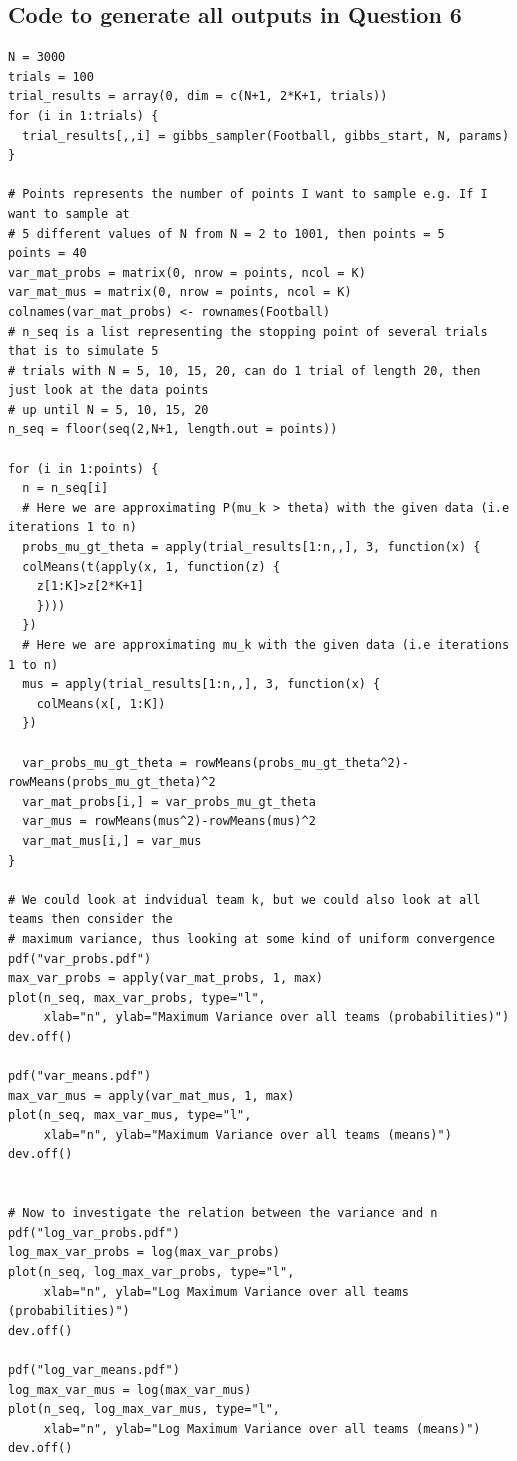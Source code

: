 \documentclass[11pt]{article} %
\begin{document}
\subsection*{Code to generate all outputs in Question 6}
\begin{lstlisting}
N = 3000
trials = 100
trial_results = array(0, dim = c(N+1, 2*K+1, trials))
for (i in 1:trials) {
  trial_results[,,i] = gibbs_sampler(Football, gibbs_start, N, params)
}

# Points represents the number of points I want to sample e.g. If I want to sample at
# 5 different values of N from N = 2 to 1001, then points = 5
points = 40
var_mat_probs = matrix(0, nrow = points, ncol = K)
var_mat_mus = matrix(0, nrow = points, ncol = K)
colnames(var_mat_probs) <- rownames(Football)
# n_seq is a list representing the stopping point of several trials that is to simulate 5 
# trials with N = 5, 10, 15, 20, can do 1 trial of length 20, then just look at the data points
# up until N = 5, 10, 15, 20
n_seq = floor(seq(2,N+1, length.out = points))

for (i in 1:points) {
  n = n_seq[i]
  # Here we are approximating P(mu_k > theta) with the given data (i.e iterations 1 to n)
  probs_mu_gt_theta = apply(trial_results[1:n,,], 3, function(x) {
  colMeans(t(apply(x, 1, function(z) {
    z[1:K]>z[2*K+1]
    })))
  })
  # Here we are approximating mu_k with the given data (i.e iterations 1 to n)
  mus = apply(trial_results[1:n,,], 3, function(x) {
    colMeans(x[, 1:K])
  })
  
  var_probs_mu_gt_theta = rowMeans(probs_mu_gt_theta^2)-rowMeans(probs_mu_gt_theta)^2
  var_mat_probs[i,] = var_probs_mu_gt_theta
  var_mus = rowMeans(mus^2)-rowMeans(mus)^2
  var_mat_mus[i,] = var_mus
}

# We could look at indvidual team k, but we could also look at all teams then consider the 
# maximum variance, thus looking at some kind of uniform convergence
pdf("var_probs.pdf")
max_var_probs = apply(var_mat_probs, 1, max)
plot(n_seq, max_var_probs, type="l",
     xlab="n", ylab="Maximum Variance over all teams (probabilities)")
dev.off()

pdf("var_means.pdf")
max_var_mus = apply(var_mat_mus, 1, max)
plot(n_seq, max_var_mus, type="l",
     xlab="n", ylab="Maximum Variance over all teams (means)")
dev.off()


# Now to investigate the relation between the variance and n
pdf("log_var_probs.pdf")
log_max_var_probs = log(max_var_probs)
plot(n_seq, log_max_var_probs, type="l",
     xlab="n", ylab="Log Maximum Variance over all teams (probabilities)")
dev.off()

pdf("log_var_means.pdf")
log_max_var_mus = log(max_var_mus)
plot(n_seq, log_max_var_mus, type="l",
     xlab="n", ylab="Log Maximum Variance over all teams (means)")
dev.off()
\end{lstlisting}
\end{document}
